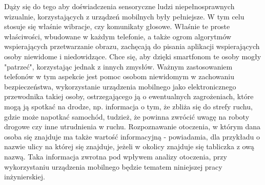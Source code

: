 \documentclass[eng,oneside]{mgr}
\begin{document}
\par Dąży się do tego aby doświadczenia sensoryczne ludzi niepełnosprawnych wizualnie, korzystających z urządzeń mobilnych były pełniejsze. W tym celu stosuje się właśnie wibracje, czy komunikaty głosowe. Właśnie te proste właściwości, wbudowane w każdym telefonie, a także ogrom algorytmów wspierających przetwarzanie obrazu, zachęcają do pisania aplikacji wspierających osoby niewidome i niedowidzące. Chce się, aby dzięki smartfonom te osoby mogły "patrzeć", korzystając jednak z innych zmysłów. Ważnym zastosowaniem telefonów w tym aspekcie jest pomoc osobom niewidomym w zachowaniu bezpieczeństwa, wykorzystanie urządzenia mobilnego jako elektronicznego przewodnika takiej osoby, ostrzegającego ją o ewentualnych zagrożeniach, które mogą ją spotkać na drodze, np. informacja o tym, że zbliża się do strefy ruchu, gdzie może napotkać samochód, tudzież, że powinna zwrócić uwagę na roboty drogowe czy inne utrudnienia w ruchu. Rozpoznawanie otoczenia, w którym dana osoba się znajduje ma także wartość informacyjną - powiadamia, dla przykładu o nazwie ulicy na której się znajduje, jeżeli w okolicy znajduje się tabliczka z ową nazwą. Taka informacja zwrotna pod wpływem analizy otoczenia, przy wykorzystaniu urządzenia mobilnego będzie tematem niniejszej pracy inżynierskiej.
\end{document}

